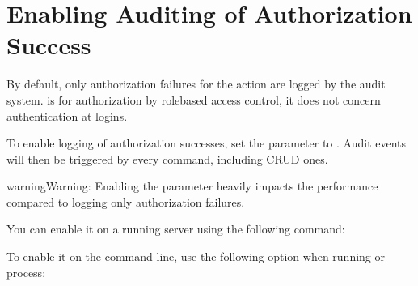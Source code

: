 \documentclass[letterpaper,10pt,english]{sphinxmanual}
\begin{document}
\begin{itemize}
\begin{sphinxVerbatim}[commandchars=\\\{\}]
    
\end{sphinxVerbatim}

\end{itemize}


\section{Enabling Auditing of Authorization Success}
\label{\detokenize{audit-logging:enabling-auditing-of-authorization-success}}\label{\detokenize{audit-logging:auditauthorizationsuccess}}
\sphinxAtStartPar
By default, only authorization failures for the  action
are logged by the audit system.  is for authorization by
role\sphinxhyphen{}based access control, it does not concern authentication at logins.

\sphinxAtStartPar
To enable logging of authorization successes,
set the  parameter to . Audit events
will then be triggered by every command, including CRUD ones.

\begin{sphinxadmonition}{warning}{Warning:}
\sphinxAtStartPar
Enabling the  parameter heavily impacts
the performance compared to logging only authorization failures.
\end{sphinxadmonition}

\sphinxAtStartPar
You can enable it on a running server using the following command:

\begin{sphinxVerbatim}[commandchars=\\\{\}]
       
\end{sphinxVerbatim}

\sphinxAtStartPar
To enable it on the command line, use the following option
when running  or  process:

\begin{sphinxVerbatim}[commandchars=\\\{\}]
 
\end{sphinxVerbatim}
\end{document}
